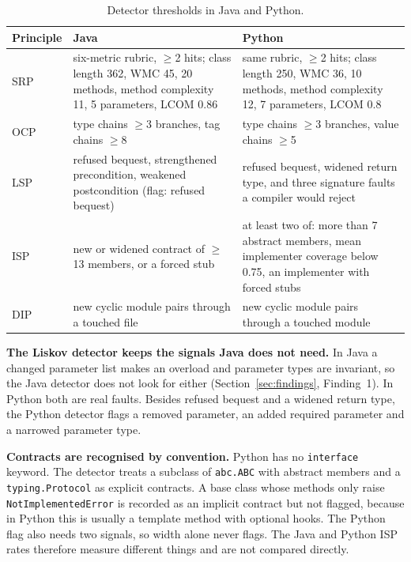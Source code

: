 \begin{table}[htb]
\centering
\caption{Detector thresholds in Java and Python.}
\label{tab:py-thresholds}
\begin{tabular}{@{}lL{5.0cm}L{5.0cm}@{}}
\toprule
\textbf{Principle} & \textbf{Java} & \textbf{Python} \\
\midrule
SRP & six-metric rubric, $\geq$2 hits; class length 362, WMC 45, 20 methods, method complexity 11,
5 parameters, LCOM 0.86 & same rubric, $\geq$2 hits; class length 250, WMC 36, 10 methods, method
complexity 12, 7 parameters, LCOM 0.8 \\
OCP & type chains $\geq$3 branches, tag chains $\geq$8 & type chains $\geq$3 branches, value chains
$\geq$5 \\
LSP & refused bequest, strengthened precondition, weakened postcondition (flag: refused bequest) &
refused bequest, widened return type, and three signature faults a compiler would reject \\
ISP & new or widened contract of $\geq$13 members, or a forced stub & at least two of: more than 7
abstract members, mean implementer coverage below 0.75, an implementer with forced stubs \\
DIP & new cyclic module pairs through a touched file & new cyclic module pairs through a touched
module \\
\bottomrule
\end{tabular}
\end{table}

\textbf{The Liskov detector keeps the signals Java does not need.} In Java a changed parameter list
makes an overload and parameter types are invariant, so the Java detector does not look for either
(Section~\ref{sec:findings}, Finding~1). In Python both are real faults. Besides refused bequest and
a widened return type, the Python detector flags a removed parameter, an added required parameter
and a narrowed parameter type.

\textbf{Contracts are recognised by convention.} Python has no \texttt{interface} keyword. The
detector treats a subclass of \texttt{abc.ABC} with abstract members and a \texttt{typing.Protocol}
as explicit contracts. A base class whose methods only raise \texttt{NotImplementedError} is recorded
as an implicit contract but not flagged, because in Python this is usually a template method with
optional hooks. The Python flag also needs two signals, so width alone never flags. The Java and
Python ISP rates therefore measure different things and are not compared directly.

